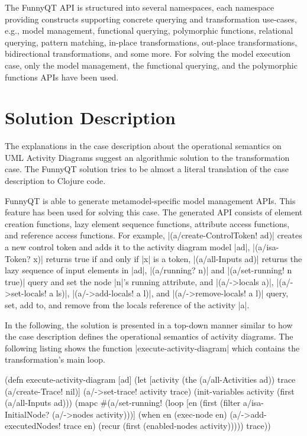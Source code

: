 \documentclass[submission]{eptcs}
\newcommand{\code}{\clojureinline}
\begin{document}
The FunnyQT API is structured into several namespaces, each namespace providing
constructs supporting concrete querying and transformation use-cases, e.g.,
model management, functional querying, polymorphic functions, relational
querying, pattern matching, in-place transformations, out-place
transformations, bidirectional transformations, and some more.  For solving the
model execution case, only the model management, the functional querying, and
the polymorphic functions APIs have been used.


\section{Solution Description}
\label{sec:solution-description}

The explanations in the case description about the operational semantics on UML
Activity Diagrams suggest an algorithmic solution to the transformation case.
The FunnyQT solution tries to be almost a literal translation of the case
description to Clojure code.

FunnyQT is able to generate metamodel-specific model management APIs.  This
feature has been used for solving this case.  The generated API consists of
element creation functions, lazy element sequence functions, attribute access
functions, and reference access functions.  For example,
\code|(a/create-ControlToken! ad)| creates a new control token and adds it to
the activity diagram model \code|ad|, \code|(a/isa-Token? x)| returns true if
and only if \code|x| is a token, \code|(a/all-Inputs ad)| returns the lazy
sequence of input elements in \code|ad|, \code|(a/running? n)| and
\code|(a/set-running! n true)| query and set the node \code|n|'s
\textsf{running} attribute, and \code|(a/->locals a)|, \code|(a/->set-locals! a
ls)|, \code|(a/->add-locals! a l)|, and \code|(a/->remove-locals! a l)| query,
set, add to, and remove from the \textsf{locals} reference of the activity
\code|a|.

\bigskip{}

In the following, the solution is presented in a top-down manner similar to how
the case description defines the operational semantics of activity diagrams.
The following listing shows the function \code|execute-activity-diagram| which
contains the transformation's main loop.

\begin{clojurecode}
(defn execute-activity-diagram [ad]
  (let [activity (the (a/all-Activities ad))
        trace (a/create-Trace! nil)]
    (a/->set-trace! activity trace)
    (init-variables activity (first (a/all-Inputs ad)))
    (mapc #(a/set-running! %
    (loop [en (first (filter a/isa-InitialNode? (a/->nodes activity)))]
      (when en
        (exec-node en)
        (a/->add-executedNodes! trace en)
        (recur (first (enabled-nodes activity)))))
    trace))
\end{clojurecode}
\end{document}
